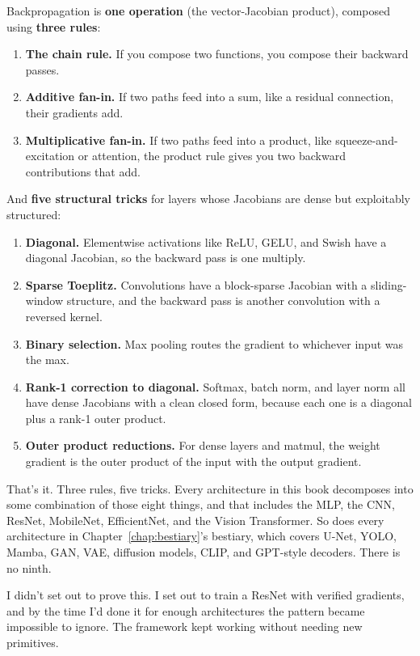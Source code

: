 Backpropagation is \textbf{one operation} (the vector-Jacobian product),
composed using \textbf{three rules}:

\begin{enumerate}
  \item \textbf{The chain rule.} If you compose two functions, you compose
    their backward passes.
  \item \textbf{Additive fan-in.} If two paths feed into a sum, like a
    residual connection, their gradients add.
  \item \textbf{Multiplicative fan-in.} If two paths feed into a product, like
    squeeze-and-excitation or attention, the product rule gives you two
    backward contributions that add.
\end{enumerate}

And \textbf{five structural tricks} for layers whose Jacobians are dense
but exploitably structured:

\begin{enumerate}
  \item \textbf{Diagonal.} Elementwise activations like ReLU, GELU, and Swish
    have a diagonal Jacobian, so the backward pass is one multiply.
  \item \textbf{Sparse Toeplitz.} Convolutions have a block-sparse Jacobian
    with a sliding-window structure, and the backward pass is another
    convolution with a reversed kernel.
  \item \textbf{Binary selection.} Max pooling routes the gradient to whichever input was the max.
  \item \textbf{Rank-1 correction to diagonal.} Softmax, batch norm, and layer
    norm all have dense Jacobians with a clean closed form, because each
    one is a diagonal plus a rank-1 outer product.
  \item \textbf{Outer product reductions.} For dense layers and matmul, the
    weight gradient is the outer product of the input with the output
    gradient.
\end{enumerate}

That's it. Three rules, five tricks. Every architecture in this book
decomposes into some combination of those eight things, and that includes
the MLP, the CNN, ResNet, MobileNet, EfficientNet, and the Vision
Transformer. So does every architecture in Chapter~\ref{chap:bestiary}'s
bestiary, which covers U-Net, YOLO, Mamba, GAN, VAE, diffusion models,
CLIP, and GPT-style decoders. There is no ninth.

I didn't set out to prove this. I set out to train a ResNet with verified
gradients, and by the time I'd done it for enough architectures the
pattern became impossible to ignore. The framework kept working without
needing new primitives.

